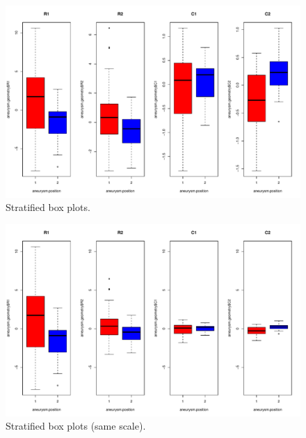 \documentclass[a4paper]{article}
\begin{document}
    \begin{figure}[!htp]
        \centering
        \includegraphics[width=\textwidth]{img/visualization-of-multivariate-data-11.pdf}
        \caption*{Stratified box plots.}
    \end{figure}

    \begin{figure}[!htp]
        \centering
        \includegraphics[width=\textwidth]{img/visualization-of-multivariate-data-12.pdf}
        \caption*{Stratified box plots (same scale).}
    \end{figure}

    \newpage
\end{document}
